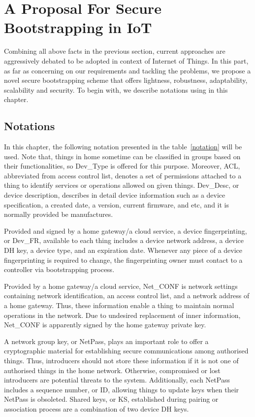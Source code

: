 \section{A Proposal For Secure Bootstrapping in IoT}\label{proposal}

Combining all above facts in the previous section, current approaches are aggressively debated to be adopted in context of Internet of Things. In this part, as far as concerning on our requirements and tackling the problems, we propose a novel secure bootstrapping scheme that offers lightness, robustness, adaptability, scalability and security. To begin with, we describe notations using in this chapter. 

\subsection{Notations}

In this chapter, the following notation presented in the table~\ref{notation} will be used. Note that, things in home sometime can be classified in groups based on their functionalities, so Dev\_Type is offered for this purpose. Moreover, ACL, abbreviated from access control list, denotes a set of permissions attached to a thing to identify services or operations allowed on given things. Dev\_Desc, or device description, describes in detail device information such as a device specification, a created date, a version, current firmware, and etc, and it is normally provided be manufactures. 

Provided and signed by a home gateway/a cloud service, a device fingerprinting, or Dev\_FR, available to each thing includes a device network address, a device DH key, a device type, and an expiration date. Whenever any piece of a device fingerprinting is required to change, the fingerprinting owner must contact to a controller via bootstrapping process. 

Provided by a home gateway/a cloud service, Net\_CONF is network settings containing network identification, an access control list, and a network address of a home gateway. Thus, these information enable a thing to maintain normal operations in the network. Due to undesired replacement of inner information, Net\_CONF is apparently signed by the home gateway private key. 

A network group key, or NetPass, plays an important role to offer a cryptographic material for establishing secure communications among authorised things. Thus, introducers should not store these information if it is not one of authorised things in the home network. Otherwise, compromised or lost introducers are potential threats to the system. Additionally, each NetPass includes a sequence number, or ID, allowing things to update keys when their NetPass is obsoleted. Shared keys, or KS, established during pairing or association process are a combination of two device DH keys. 

